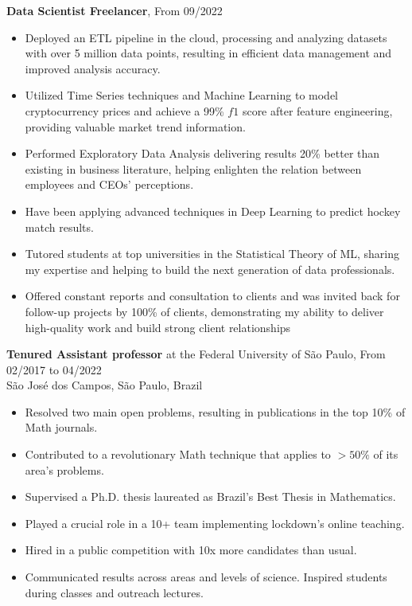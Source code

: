 \documentclass[10pt]{article}
\begin{document}
	\textbf{Data Scientist Freelancer}, \hfill From 09/2022 
	

\begin{itemize}
\item	Deployed an ETL pipeline in the cloud, processing and analyzing datasets with over 5 million data points, resulting in efficient data management and improved analysis accuracy.
	\item Utilized Time Series techniques and Machine Learning to model cryptocurrency prices and achieve a 99\% $f1$ score after feature engineering, providing valuable market trend information.
	\item Performed Exploratory Data Analysis delivering results 20\% better than existing in business literature, helping enlighten the relation between employees and CEOs' perceptions.
	\item Have been applying advanced techniques in Deep Learning to predict hockey match results.
	\item Tutored students at top universities in the Statistical Theory of ML, sharing my expertise and helping to build the next generation of data professionals.
	\item Offered constant reports and consultation to clients and was invited back for follow-up projects by 100\% of clients, demonstrating my ability to deliver high-quality work and build strong client relationships
\end{itemize}
	
	\textbf{Tenured Assistant professor } at the {Federal University of São Paulo},  \hfill From 02/2017 to 04/2022\\São José dos Campos, São Paulo, Brazil
	
	\begin{itemize}
		\item Resolved two main open problems, resulting in publications in the top 10\% of Math journals.
	\item	Contributed to a revolutionary Math technique that applies to $>50\%$ of its area's problems.
\item 		Supervised a Ph.D. thesis laureated as Brazil's Best Thesis in Mathematics.
\item 		Played a crucial role in a 10+ team implementing lockdown's online teaching.
	\item	Hired in a public competition with 10x more candidates than usual.
\item 		Communicated results across areas and levels of science. Inspired students during classes and outreach lectures. 
		
	\end{itemize}
	
\end{document}
